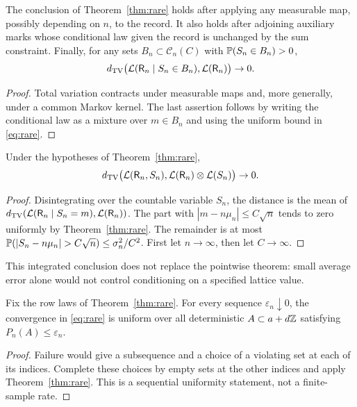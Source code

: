 \begin{corollary}\label{cor:maps}
The conclusion of Theorem~\ref{thm:rare} holds after applying any measurable map, possibly depending on $n$, to the record. It also holds after adjoining auxiliary marks whose conditional law given the record is unchanged by the sum constraint. Finally, for any sets $B_n\subset\mathcal C_n(C)$ with $\mathbb P(S_n\in B_n)>0$,
\[
 d_{\mathrm{TV}}\bigl(\mathcal L(\mathsf R_n\mid S_n\in B_n),\mathcal L(\mathsf R_n)\bigr)\to0.
\]
\end{corollary}
\begin{proof}
Total variation contracts under measurable maps and, more generally, under a common Markov kernel. The last assertion follows by writing the conditional law as a mixture over $m\in B_n$ and using the uniform bound in \eqref{eq:rare}.
\end{proof}

\begin{corollary}\label{cor:independence}
Under the hypotheses of Theorem~\ref{thm:rare},
\[
 d_{\mathrm{TV}}\bigl(\mathcal L(\mathsf R_n,S_n),\mathcal L(\mathsf R_n)\otimes\mathcal L(S_n)\bigr)\to0.
\]
\end{corollary}
\begin{proof}
Disintegrating over the countable variable $S_n$, the distance is the mean of
$d_{\mathrm{TV}}(\mathcal L(\mathsf R_n\mid S_n=m),\mathcal L(\mathsf R_n))$. The part with
$|m-n\mu_n|\le C\sqrt n$ tends to zero uniformly by Theorem~\ref{thm:rare}.
The remainder is at most $\Pp(|S_n-n\mu_n|>C\sqrt n)\le\sigma_n^2/C^2$.
First let $n\to\infty$, then let $C\to\infty$.
\end{proof}
This integrated conclusion does not replace the pointwise theorem: small average error alone would not control conditioning on a specified lattice value.

\begin{corollary}\label{cor:uniformsets}
Fix the row laws of Theorem~\ref{thm:rare}. For every sequence $\varepsilon_n\downarrow0$, the convergence in \eqref{eq:rare} is uniform over all deterministic $A\subset a+d\mathbb Z$ satisfying $P_n(A)\le\varepsilon_n$.
\end{corollary}
\begin{proof}
Failure would give a subsequence and a choice of a violating set at each of its indices. Complete these choices by empty sets at the other indices and apply Theorem~\ref{thm:rare}. This is a sequential uniformity statement, not a finite-sample rate.
\end{proof}

